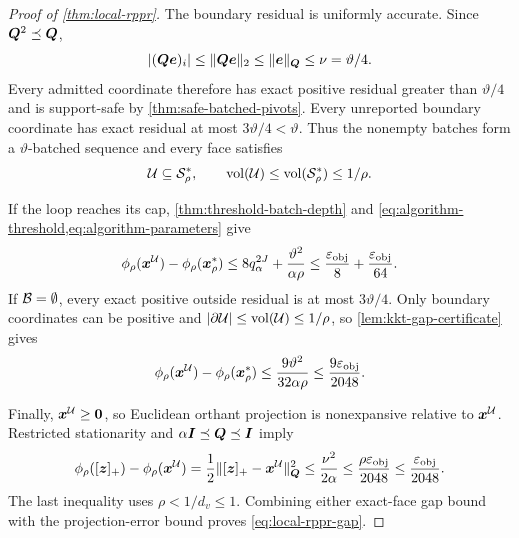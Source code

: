 \begin{proof}[Proof of \cref{thm:local-rppr}]
The boundary residual is uniformly accurate.  Since
$\bm{Q}^2\preceq\bm{Q}$,
\begin{equation*}
 |(\bm{Q}\bm{e})_i|\leq\lVert\bm{Q}\bm{e}\rVert_2
 \leq\lVert\bm{e}\rVert_{\bm{Q}}\leq\nu=\vartheta/4.
\end{equation*}
Every admitted coordinate therefore has exact positive residual greater than
$\vartheta/4$ and is support-safe by
\cref{thm:safe-batched-pivots}.  Every unreported boundary coordinate has
exact residual at most $3\vartheta/4<\vartheta$.  Thus the nonempty batches
form a $\vartheta$-batched sequence and every face satisfies
\begin{equation}
 \mathcal{U}\subseteq\mathcal S_\rho^*,
 \qquad
 \operatorname{vol}(\mathcal{U})\leq\operatorname{vol}(\mathcal S_\rho^*)\leq1/\rho.
 \label{eq:algorithm-face-volume}
\end{equation}

If the loop reaches its cap, \cref{thm:threshold-batch-depth} and
\cref{eq:algorithm-threshold,eq:algorithm-parameters} give
\begin{equation*}
 \phi_\rho(\bm{x}^{\mathcal{U}})-\phi_\rho(\bm{x}_\rho^*)
 \leq8q_\alpha^{2J}+\frac{\vartheta^2}{\alpha\rho}
 \leq\frac{\varepsilon_{\mathrm{obj}}}{8}+\frac{\varepsilon_{\mathrm{obj}}}{64}.
\end{equation*}
If $\mathcal{B}=\emptyset$, every exact positive outside residual is at most
$3\vartheta/4$.  Only boundary coordinates can be positive and
$|\partial \mathcal{U}|\leq\operatorname{vol}(\mathcal{U})\leq1/\rho$, so
\cref{lem:kkt-gap-certificate} gives
\begin{equation*}
 \phi_\rho(\bm{x}^{\mathcal{U}})-\phi_\rho(\bm{x}_\rho^*)
 \leq\frac{9\vartheta^2}{32\alpha\rho}
 \leq\frac{9\varepsilon_{\mathrm{obj}}}{2048}.
\end{equation*}

Finally, $\bm{x}^{\mathcal{U}}\geq\bm{0}$, so Euclidean orthant projection is nonexpansive
relative to $\bm{x}^{\mathcal{U}}$.  Restricted stationarity and
$\alpha\bm{I}\preceq\bm{Q}\preceq\bm{I}$ imply
\begin{equation*}
 \phi_\rho([\bm{z}]_+)-\phi_\rho(\bm{x}^{\mathcal{U}})
 =\frac12\lVert[\bm{z}]_+-\bm{x}^{\mathcal{U}}\rVert_{\bm{Q}}^2
 \leq\frac{\nu^2}{2\alpha}
 \leq\frac{\rho\varepsilon_{\mathrm{obj}}}{2048}
 \leq\frac{\varepsilon_{\mathrm{obj}}}{2048}.
\end{equation*}
The last inequality uses $\rho<1/d_v\leq1$. Combining either exact-face
gap bound with the projection-error bound proves \cref{eq:local-rppr-gap}.


\end{proof}
